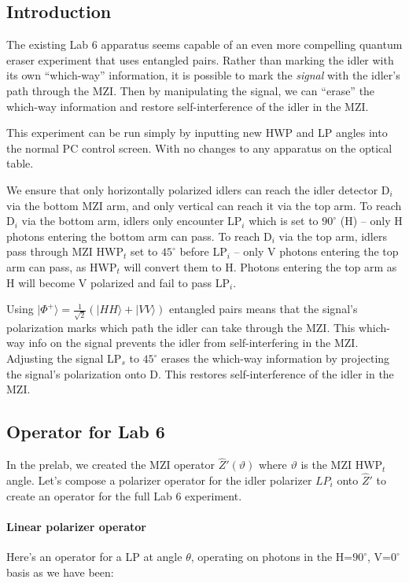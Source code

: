 \documentclass{article}
\begin{document}
\pagestyle{empty}



\subsection*{Introduction}

The existing Lab 6 apparatus seems capable of an even more compelling quantum
eraser experiment that uses entangled pairs.
Rather than marking the idler with its own ``which-way'' information, it is possible
to mark the \emph{signal} with the idler's path through the MZI.
Then by manipulating the signal, we can ``erase'' the which-way information
and restore self-interference of the idler in the MZI.

This experiment can be run simply by inputting new HWP and LP angles
into the normal PC control screen.
With no changes to any apparatus on the optical table.

We ensure that only horizontally polarized idlers
can reach the idler detector D$_i$ via the bottom MZI arm,
and only vertical can reach it via the top arm.
To reach D$_i$ via the bottom arm, idlers only encounter
LP$_i$ which is set to $90^\circ$ (H) -- only
H photons entering the bottom arm can pass.
To reach D$_i$ via the top arm, idlers pass through
MZI HWP$_t$ set to $45^\circ$ before LP$_i$ -- only
V photons entering the top arm can pass, as HWP$_t$
will convert them to H.
Photons entering the top arm as H will become V polarized
and fail to pass LP$_i$.

Using $| \Phi^+ \rangle = \frac{1}{\sqrt2}(|HH\rangle + |VV\rangle)$
entangled pairs means that the signal's polarization marks which
path the idler can take through the MZI.
This which-way info on the signal
prevents the idler from self-interfering in the MZI.
Adjusting the signal LP$_s$ to $45^\circ$ erases the which-way information
by projecting the signal's polarization onto D.
This restores self-interference of the idler in the MZI.

\subsection*{Operator for Lab 6}

In the prelab, we created the MZI operator $\hat{Z}'(\vartheta)$
where $\vartheta$ is the MZI HWP$_t$ angle.
Let's compose a polarizer operator for the idler polarizer
$LP_i$ onto $\hat{Z}'$
to create an operator for the full Lab 6 experiment.

\paragraph{Linear polarizer operator}
Here's an operator for a LP at angle $\theta$,
operating on photons in the H=$90^\circ$, V=$0^\circ$ basis as we have been:
\end{document}
